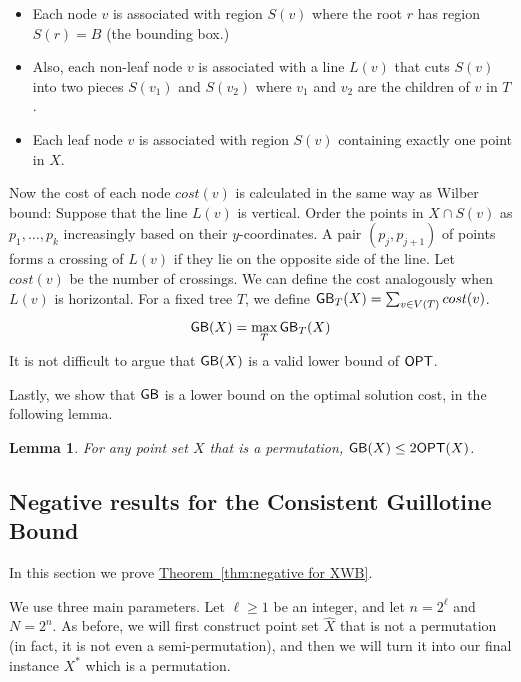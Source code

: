 \documentclass[11pt]{article}
\numberwithin{equation}{section}
\newtheorem{lemma}[theorem]{Lemma}
\theoremstyle{definition}
\theoremstyle{plain}
\newcommand{\expref}[2]{\hyperref[#2]{#1~\ref{#2}}}
\begin{document}
\begin{itemize}
\item Each node $v$ is associated with region $S(v)$ where the root $r$ has region $S(r) = B$ (the bounding box.) 

\item Also, each non-leaf node $v$ is associated with a line $L(v)$ that cuts $S(v)$ into two pieces $S(v_1)$ and $S(v_2)$ where $v_1$ and $v_2$ are the children of $v$ in $T$.

\item Each leaf node $v$ is associated with region $S(v)$ containing exactly one point in $X$.  
\end{itemize}  

Now the cost of each node $cost(v)$ is calculated in the same way as Wilber bound: Suppose that the line $L(v)$ is vertical. Order the points in $X \cap S(v)$ as $p_1, \ldots, p_k$ increasingly based on their $y$-coordinates. A pair $(p_j, p_{j+1})$ of points forms a crossing of $L(v)$ if they lie on the opposite side of the line.
Let $cost(v)$ be the number of crossings. 
We can define the cost analogously when $L(v)$ is horizontal. 
For a fixed tree $T$, we define $\mathsf{GB}_{T}(X) = \sum_{v \in V(T)} cost(v)$. 
\[ \mathsf{GB}(X) = \max_{T} \mathsf{GB}_{T}(X) \]  
It is not difficult to argue that $\mathsf{GB}(X)$ is a valid lower bound of $\mbox{\sf OPT}$. 
\fi

Lastly, we show that $\mathsf{GB}$ is a lower bound on the optimal solution cost, in the following lemma. 

\begin{lemma}\label{lem: GB is lb for opt}
For any point set $X$ that is a permutation, $\mathsf{GB}(X) \leq 2 \mbox{\sf OPT}(X)$.  
\end{lemma} 


%
%
%


%
%



%
%
%
%
\subsection{Negative results for the Consistent Guillotine Bound}\label{subsec: Instance construction for extended}
%
%
%
%
In this section we prove \expref{Theorem}{thm:negative for XWB}.

\newcommand{\EESBRS}{\mbox{\sf 2D-ES-BRS}}
We use three main parameters. Let $\ell\geq 1$ be an integer, and let $n = 2^{\ell}$ and $N= 2^n$.
As before, we will first construct point set $\hat{X}$ that is not a permutation (in fact, it is not even a semi-permutation), and then we will turn it into our final instance $X^*$ which is a permutation.  
%
\end{document}
